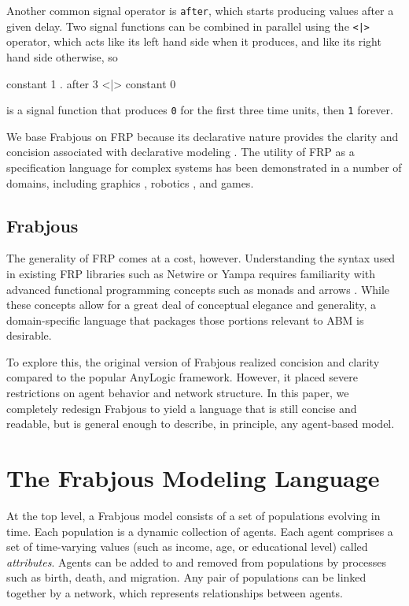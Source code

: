 \documentclass[oribibl]{llncs}
\begin{document}
  Another common signal operator is \lstinline{after}, which starts producing values after a given delay. Two signal functions can be combined in parallel using the \lstinline{<|> } operator, which acts like its left hand side when it produces, and like its right hand side otherwise, so 
\begin{code}
	constant 1 . after 3 <|> constant 0
\end{code}
is a signal function that produces \lstinline{0} for the first three time units, then \lstinline{1} forever. 
  
 We base Frabjous on FRP because its declarative nature provides the clarity and concision associated with declarative modeling \cite{system_dyn_approaches, system_dyn_tradeoffs}. The utility of FRP as a specification language for complex systems has been demonstrated in a number of domains, including graphics \cite{fran}, robotics \cite{robots}, and games\cite{yampa}.
\subsection{Frabjous}
  
  The generality of FRP comes at a cost, however. Understanding the syntax used in existing FRP libraries such as Netwire or Yampa \cite{yampa} requires familiarity with advanced functional programming concepts such as monads \cite{monads} and arrows \cite{mon2arr}. While these concepts allow for a great deal of conceptual elegance and generality, a domain-specific language that packages those portions relevant to ABM is desirable. 
  
  To explore this, the original version of Frabjous\cite{frabjous} realized concision and clarity compared to the popular AnyLogic framework. However, it placed severe restrictions on agent behavior and network structure. In this paper, we completely redesign Frabjous to yield a language that is still concise and readable, but is general enough to describe, in principle, any agent-based model.
  
\section{The Frabjous Modeling Language}

At the top level, a Frabjous model consists of a set of populations evolving in time. Each population is a dynamic collection of agents. Each agent comprises a set of time-varying values (such as income, age, or educational level) called \emph{attributes}. Agents can be added to and removed from populations by processes such as birth, death, and migration. Any pair of populations can be linked together by a network, which represents relationships between agents.
\end{document}
